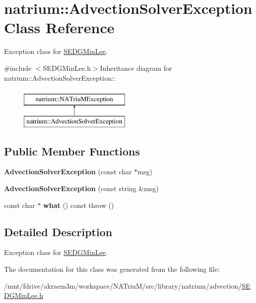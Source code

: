\hypertarget{classnatrium_1_1AdvectionSolverException}{
\section{natrium::AdvectionSolverException Class Reference}
\label{classnatrium_1_1AdvectionSolverException}
}


Exception class for \hyperlink{classnatrium_1_1SEDGMinLee}{SEDGMinLee}.  


{\ttfamily \#include $<$SEDGMinLee.h$>$}Inheritance diagram for natrium::AdvectionSolverException::\begin{figure}[H]
\begin{center}
\leavevmode
\includegraphics[height=2cm]{classnatrium_1_1AdvectionSolverException}
\end{center}
\end{figure}
\subsection*{Public Member Functions}
\begin{DoxyCompactItemize}
\item 
\hypertarget{classnatrium_1_1AdvectionSolverException_a443084a12dee879bdfbfc900202a0706}{
{\bfseries AdvectionSolverException} (const char $\ast$msg)}
\label{classnatrium_1_1AdvectionSolverException_a443084a12dee879bdfbfc900202a0706}

\item 
\hypertarget{classnatrium_1_1AdvectionSolverException_a9cda3faa279e3528f96c3780a91545bd}{
{\bfseries AdvectionSolverException} (const string \&msg)}
\label{classnatrium_1_1AdvectionSolverException_a9cda3faa279e3528f96c3780a91545bd}

\item 
\hypertarget{classnatrium_1_1AdvectionSolverException_aeb13fafe3f75de7cfd4e282a8a0fb5b0}{
const char $\ast$ {\bfseries what} () const   throw ()}
\label{classnatrium_1_1AdvectionSolverException_aeb13fafe3f75de7cfd4e282a8a0fb5b0}

\end{DoxyCompactItemize}


\subsection{Detailed Description}
Exception class for \hyperlink{classnatrium_1_1SEDGMinLee}{SEDGMinLee}. 

The documentation for this class was generated from the following file:\begin{DoxyCompactItemize}
\item 
/mnt/fdrive/akraem3m/workspace/NATriuM/src/library/natrium/advection/\hyperlink{SEDGMinLee_8h}{SEDGMinLee.h}\end{DoxyCompactItemize}
